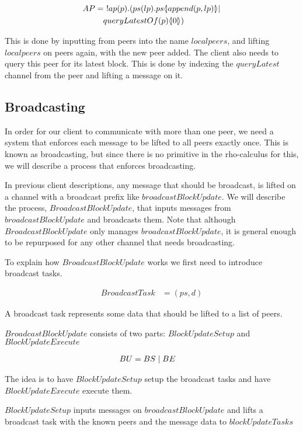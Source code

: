 \begin{align*}
    AP &=\ !ap(p).(ps(lp).ps \langle \! | append(p,lp) | \! \rangle|\\
        &\quad queryLatestOf(p) \langle \! | 0 | \! \rangle)\\
\end{align*}

This is done by inputting from peers into the name $localpeers$, and lifting $localpeers$ on peers again, with the new peer added.
The client also needs to query this peer for its latest block.
This is done by indexing the $queryLatest$ channel from the peer and lifting a message on it.

\subsection{Broadcasting}
In order for our client to communicate with more than one peer, we need a system that enforces each message to be lifted to all peers exactly once. This is known as broadcasting, but since there is no primitive in the rho-calculus for this, we will describe a process that enforces broadcasting.

In previous client descriptions, any message that should be broadcast, is lifted on a channel with a broadcast prefix like $broadcastBlockUpdate$.
We will describe the process, $BroadcastBlockUpdate$, that inputs messages from $broadcastBlockUpdate$ and broadcasts them.
Note that although $BroadcastBlockUpdate$ only manages $broadcastBlockUpdate$, it is general enough to be repurposed for any other channel that needs broadcasting.

To explain how $BroadcastBlockUpdate$ works we first need to introduce broadcast tasks.

\begin{align*}
    BroadcastTask &= (ps, d)
\end{align*}

A broadcast task represents some data that should be lifted to a list of peers.

$BroadcastBlockUpdate$ consists of two parts: $BlockUpdateSetup$ and $BlockUpdateExecute$

\begin{align*}
    BU &= BS \mid BE
\end{align*}

The idea is to have $BlockUpdateSetup$ setup the broadcast tasks and have $BlockUpdateExecute$ execute them.

$BlockUpdateSetup$ inputs messages on $broadcastBlockUpdate$ and lifts a broadcast task with the known peers and the message data to $blockUpdateTasks$

